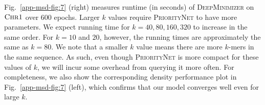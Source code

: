 \noindent Fig.~\ref{app-msd-fig:7} (right) measures runtime (in seconds) of \textsc{DeepMinimizer} on $\textsc{Chr1}$ over $600$ epochs. Larger $k$ values require \textsc{PriorityNet} to have more parameters. We expect running time for $k=40, 80, 160, 320$ to increase in the same order. For $k=10$ and $20$, however, the running times are approximately the same as $k=80$. We note that a smaller $k$ value means there are more $k$-mers in the same sequence. As such, even though \textsc{PriorityNet} is more compact for these values of $k$, we will incur some overhead from querying it more often. For completeness, we also show the corresponding density performance plot in Fig.~\ref{app-msd-fig:7} (left), which confirms that our model converges well even for large $k$.